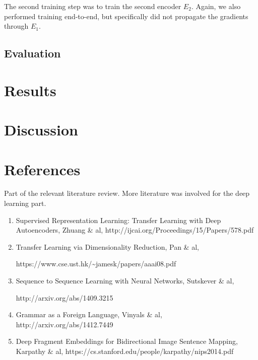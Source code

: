 \documentclass[12pt]{article}
\begin{document}
The second training step was to train the second encoder $E_2$. Again,
we also performed training end-to-end, but specifically did not
propagate the gradients through $E_1$.

\subsection{Evaluation}\label{evaluation}

\section{Results}\label{results}

\section{Discussion}\label{discussion}

\section{References}\label{references}

Part of the relevant literature review. More literature was involved for
the deep learning part.

\begin{enumerate}
\def\labelenumi{\arabic{enumi}.}
\item
  Supervised Representation Learning: Transfer Learning with Deep
  Autoencoders, Zhuang \& al,
  http://ijcai.org/Proceedings/15/Papers/578.pdf
\item
  Transfer Learning via Dimensionality Reduction, Pan \& al,

  https://www.cse.ust.hk/\textasciitilde{}jamesk/papers/aaai08.pdf
\item
  Sequence to Sequence Learning with Neural Networks, Sutskever \& al,

  http://arxiv.org/abs/1409.3215
\item
  Grammar as a Foreign Language, Vinyals \& al,
  http://arxiv.org/abs/1412.7449
\item
  Deep Fragment Embeddings for Bidirectional Image Sentence Mapping,
  Karpathy \& al, https://cs.stanford.edu/people/karpathy/nips2014.pdf
\end{enumerate}

\end{document}
